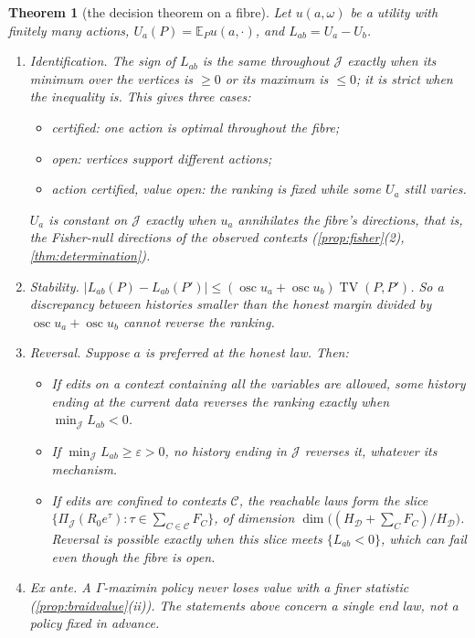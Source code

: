 \documentclass[11pt]{article}
\newtheorem{theorem}{Theorem}\newtheorem{proposition}[theorem]{Proposition}\newtheorem{lemma}[theorem]{Lemma}\newtheorem{corollary}[theorem]{Corollary}\newtheorem{conjecture}[theorem]{Conjecture}\crefname{conjecture}{Conjecture}{Conjectures}
\theoremstyle{definition}\newtheorem{definition}[theorem]{Definition}\newtheorem{remark}[theorem]{Remark}\newtheorem{example}[theorem]{Example}\newtheorem{problem}[theorem]{Open problem}\crefname{problem}{Problem}{Problems}
\begin{document}
\begin{theorem}[the decision theorem on a fibre]\label{thm:decision}
Let $u(a,\omega)$ be a utility with finitely many actions, $U_a(P)=\mathbb E_Pu(a,\cdot)$, and $L_{ab}=U_a-U_b$.
\begin{enumerate}
\item[(i)] \emph{Identification.} The sign of $L_{ab}$ is the same throughout $\mathcal J$ exactly when its minimum over the vertices is $\ge0$ or its maximum is $\le0$; it is strict when the inequality is. This gives three cases:
\begin{itemize}
\item \emph{certified}: one action is optimal throughout the fibre;
\item \emph{open}: vertices support different actions;
\item \emph{action certified, value open}: the ranking is fixed while some $U_a$ still varies.
\end{itemize}
$U_a$ is constant on $\mathcal J$ exactly when $u_a$ annihilates the fibre's directions, that is, the Fisher-null directions of the observed contexts (\cref{prop:fisher}(2), \cref{thm:determination}).
\item[(ii)] \emph{Stability.} $|L_{ab}(P)-L_{ab}(P')|\le(\operatorname{osc}u_a+\operatorname{osc}u_b)\operatorname{TV}(P,P')$. So a discrepancy between histories smaller than the honest margin divided by $\operatorname{osc}u_a+\operatorname{osc}u_b$ cannot reverse the ranking.
\item[(iii)] \emph{Reversal.} Suppose $a$ is preferred at the honest law. Then:
\begin{itemize}
\item If edits on a context containing all the variables are allowed, some history ending at the current data reverses the ranking exactly when $\min_{\mathcal J}L_{ab}<0$.
\item If $\min_{\mathcal J}L_{ab}\ge\varepsilon>0$, no history ending in $\mathcal J$ reverses it, whatever its mechanism.
\item If edits are confined to contexts $\mathcal C$, the reachable laws form the slice $\{\Pi_{\mathcal J}(R_0e^{\tau}):\tau\in\sum_{C\in\mathcal C}F_C\}$, of dimension $\dim\big((H_{\mathcal D}+\sum_CF_C)/H_{\mathcal D}\big)$. Reversal is possible exactly when this slice meets $\{L_{ab}<0\}$, which can fail even though the fibre is open.
\end{itemize}
\item[(iv)] \emph{Ex ante.} A $\Gamma$-maximin policy never loses value with a finer statistic (\cref{prop:braidvalue}(ii)). The statements above concern a single end law, not a policy fixed in advance.
\end{enumerate}
\end{theorem}
\end{document}
